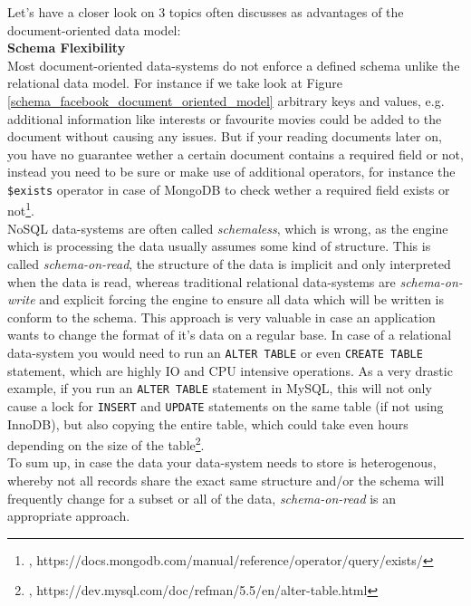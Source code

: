 {Let's have a closer look on 3 topics often discusses as advantages of the document-oriented data model:\\

\textbf{Schema Flexibility}\\
Most document-oriented data-systems do not enforce a defined schema unlike the relational data model. For instance if we take look at Figure \ref{schema_facebook_document_oriented_model} arbitrary keys and values, e.g. additional information like interests or favourite movies could be added to the document without causing any issues. But if your reading documents later on, you have no guarantee wether a certain document contains a required field or not, instead you need to be sure or make use of additional operators, for instance the \lstinline{$exists} operator in case of MongoDB to check wether a required field exists or not\footnote{\cite{MDBEX}, https://docs.mongodb.com/manual/reference/operator/query/exists/}. \\
NoSQL data-systems are often called \textit{schemaless}, which is wrong, as the engine which is processing the data usually assumes some kind of structure. This is called \textit{schema-on-read}, the structure of the data is implicit and only interpreted when the data is read, whereas traditional relational data-systems are \textit{schema-on-write} and explicit forcing the engine to ensure all data which will be written is conform to the schema. This approach is very valuable in case an application wants to change the format of it's data on a regular base. In case of a relational data-system you would need to run an \lstinline{ALTER TABLE} or even \lstinline{CREATE TABLE} statement, which are highly IO and CPU intensive operations. As a very drastic example, if you run an \lstinline{ALTER TABLE} statement in MySQL, this will not only cause a lock for \lstinline{INSERT} and \lstinline{UPDATE} statements on the same table (if not using InnoDB), but also copying the entire table, which could take even hours depending on the size of the table\footnote{\cite{MYSQLAT}, https://dev.mysql.com/doc/refman/5.5/en/alter-table.html}.\\
To sum up, in case the data your data-system needs to store is heterogenous, whereby not all records share the exact same structure and/or the schema will frequently change for a subset or all of the data, \textit{schema-on-read} is an appropriate approach.\\

}
